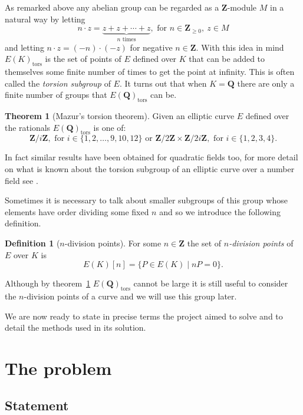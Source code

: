 \documentclass[a4paper,abstracton,bibtotoc]{scrreprt}
\theoremstyle{definition}
\newtheorem{thm}{Theorem}
\newtheorem{defn}{Definition}
\newcommand{\QQ}{\mathbf{Q}}
\newcommand{\ZZ}{\mathbf{Z}}
\begin{document}
As remarked above any abelian group can be regarded as a $\ZZ$-module $M$ in a natural way by letting 
\[n\cdot z = \underbrace{z + z + \cdots + z}_\text{$n$ times},\text{ for } n\in\ZZ_{\ge 0},\ z\in M\]
and letting $n\cdot z = (-n)\cdot(-z)$ for negative $n\in \ZZ$.
With this idea in mind $E(K)_\text{tors}$ is the set of points of $E$ defined over $K$ that can be added to themselves some finite number of times to get the point at infinity.
This is often called the \emph{torsion subgroup} of $E$.
It turns out that when $K = \QQ$ there are only a finite number of groups that $E(\QQ)_\text{tors}$ can be.

\begin{thm}[Mazur's torsion theorem]
\label{thm:tors}
Given an elliptic curve $E$ defined over the rationals $E(\QQ)_\text{tors}$ is one of:
\[
\ZZ/i\ZZ,\text{ for } i \in\{1,2,\ldots,9,10,12\}\text{ or }
\ZZ/2\ZZ \times \ZZ/2i\ZZ,\text{ for } i \in\{1,2,3,4\}.
\]
\end{thm}

In fact similar results have been obtained for quadratic fields too, for more detail on what is known about the torsion subgroup of an elliptic curve over a number field see \cite{sutherland}.

Sometimes it is necessary to talk about smaller subgroups of this group whose elements have order dividing some fixed $n$ and so we introduce the following definition.
\begin{defn}[$n$-division points]
For some $n\in\ZZ$ the set of \emph{$n$-division points} of $E$ over $K$ is
\[
E(K)[n] = \{P\in E(K) \mid nP = 0\}.
\]
\end{defn}
Although by theorem~\ref{thm:tors} $E(\QQ)_\text{tors}$ cannot be large it is still useful to consider the $n$-division points of a curve and we will use this group later.

\minisec{}
We are now ready to state in precise terms the project aimed to solve and to detail the methods used in its solution.

\chapter{The problem}
\label{chap:prob}
\section{Statement}
\label{sec:statements}
\end{document}
